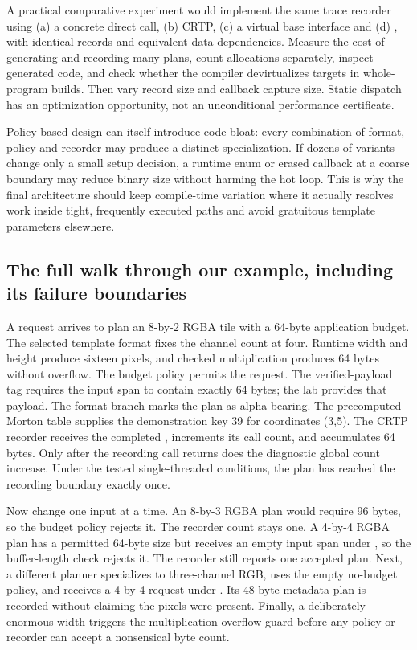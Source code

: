 A practical comparative experiment would implement the same trace recorder using (a) a concrete direct call, (b) CRTP, (c) a virtual base interface and (d) , with identical records and equivalent data dependencies. Measure the cost of generating and recording many plans, count allocations separately, inspect generated code, and check whether the compiler devirtualizes targets in whole-program builds. Then vary record size and callback capture size. Static dispatch has an optimization opportunity, not an unconditional performance certificate.

Policy-based design can itself introduce code bloat: every combination of format, policy and recorder may produce a distinct specialization. If dozens of variants change only a small setup decision, a runtime enum or erased callback at a coarse boundary may reduce binary size without harming the hot loop. This is why the final architecture should keep compile-time variation where it actually resolves work inside tight, frequently executed paths and avoid gratuitous template parameters elsewhere.

\subsection{The full walk through our example, including its failure boundaries}\label{05-engine-i-ch005-the-full-walk-through-our-example-including-its-failure-boundaries}

\hypertarget{05-engine-i-ch005-the-full-walk-through-our-example-including-its-failure-boundaries}{}

A request arrives to plan an 8-by-2 RGBA tile with a 64-byte application budget. The selected template format fixes the channel count at four. Runtime width and height produce sixteen pixels, and checked multiplication produces 64 bytes without overflow. The budget policy permits the request. The verified-payload tag requires the input span to contain exactly 64 bytes; the lab provides that payload. The  format branch marks the plan as alpha-bearing. The precomputed Morton table supplies the demonstration key 39 for coordinates (3,5). The CRTP recorder receives the completed , increments its call count, and accumulates 64 bytes. Only after the recording call returns does the diagnostic global count increase. Under the tested single-threaded conditions, the plan has reached the recording boundary exactly once.

Now change one input at a time. An 8-by-3 RGBA plan would require 96 bytes, so the budget policy rejects it. The recorder count stays one. A 4-by-4 RGBA plan has a permitted 64-byte size but receives an empty input span under , so the buffer-length check rejects it. The recorder still reports one accepted plan. Next, a different planner specializes to three-channel RGB, uses the empty no-budget policy, and receives a 4-by-4 request under . Its 48-byte metadata plan is recorded without claiming the pixels were present. Finally, a deliberately enormous width triggers the multiplication overflow guard before any policy or recorder can accept a nonsensical byte count.


